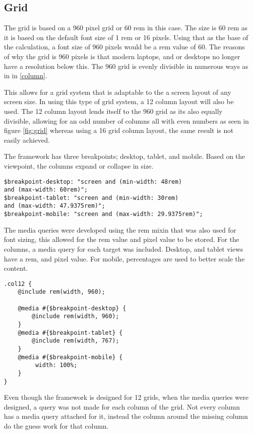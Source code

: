 \newpage
\subsection*{Grid}

The grid is based on a 960 pixel grid or 60 rem in this case. The size is 60 rem as it is based on the default font size of 1 rem or 16 pixels. Using that as the base of the calculation, a font size of 960 pixels would be a rem value of 60. The reasons of why the grid is 960 pixels is that modern laptops, and or desktops no longer have a resolution below this. The 960 grid is evenly divisible in numerous ways as in in \ref{column}. 

This allows for a grid system that is adaptable to the a screen layout of any screen size. In using this type of grid system, a 12 column layout will also be used. The 12 column layout lends itself to the 960 grid as its also equally divisible, allowing for an odd number of columns all with even numbers as seen in figure \ref{fig:grid} whereas using a 16 grid column layout, the same result is not easily achieved. 

The framework has three breakpoints; desktop, tablet, and mobile. Based on the viewpoint, the columns expand or collapse in size. 

\begin{lstlisting}[language=CSS3]
$breakpoint-desktop: "screen and (min-width: 48rem) 
and (max-width: 60rem)";
$breakpoint-tablet: "screen and (min-width: 30rem) 
and (max-width: 47.9375rem)";
$breakpoint-mobile: "screen and (max-width: 29.9375rem)";
\end{lstlisting}

The media queries were developed using the rem mixin that was also used for font sizing, this allowed for the rem value and pixel value to be stored. For the columns, a media query for each target was included. Desktop, and tablet views have a rem, and pixel value. For mobile, percentages are used to better scale the content.

\newpage
\begin{lstlisting}[language=CSS3]
.col12 {
	@include rem(width, 960);

	@media #{$breakpoint-desktop} {
		@include rem(width, 960);
	}
	@media #{$breakpoint-tablet} {
		@include rem(width, 767);
	}
	@media #{$breakpoint-mobile} {
		 width: 100%;
	}
}
\end{lstlisting}

Even though the framework is designed for 12 grids, when the media queries were designed, a query was not made for each column of the grid. Not every column has a media query attached for it, instead the column around the missing column do the guess work for that column. 

